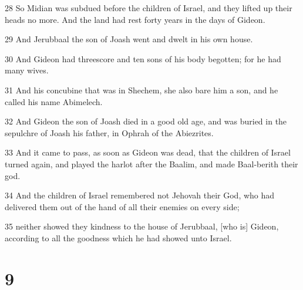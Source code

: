 \par 28 So Midian was subdued before the children of Israel, and they lifted up their heads no more. And the land had rest forty years in the days of Gideon.
\par 29 And Jerubbaal the son of Joash went and dwelt in his own house.
\par 30 And Gideon had threescore and ten sons of his body begotten; for he had many wives.
\par 31 And his concubine that was in Shechem, she also bare him a son, and he called his name Abimelech.
\par 32 And Gideon the son of Joash died in a good old age, and was buried in the sepulchre of Joash his father, in Ophrah of the Abiezrites.
\par 33 And it came to pass, as soon as Gideon was dead, that the children of Israel turned again, and played the harlot after the Baalim, and made Baal-berith their god.
\par 34 And the children of Israel remembered not Jehovah their God, who had delivered them out of the hand of all their enemies on every side;
\par 35 neither showed they kindness to the house of Jerubbaal, [who is] Gideon, according to all the goodness which he had showed unto Israel.

\chapter{9}

